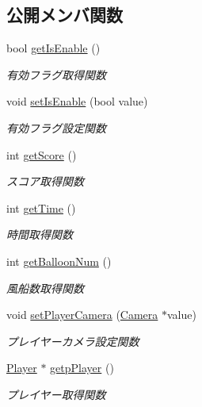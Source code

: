 \subsection*{公開メンバ関数}
\begin{DoxyCompactItemize}
\item 
bool \mbox{\hyperlink{class_stage_manager_ad250f6b9d743f80e67f449abb49e7ac2}{get\+Is\+Enable}} ()
\begin{DoxyCompactList}\small\item\em 有効フラグ取得関数 \end{DoxyCompactList}\item 
void \mbox{\hyperlink{class_stage_manager_a82938cb01ba1adbb3620fee0a12397ec}{set\+Is\+Enable}} (bool value)
\begin{DoxyCompactList}\small\item\em 有効フラグ設定関数 \end{DoxyCompactList}\item 
int \mbox{\hyperlink{class_stage_manager_ae54498baebd27e0b48c7bcfbe6555b34}{get\+Score}} ()
\begin{DoxyCompactList}\small\item\em スコア取得関数 \end{DoxyCompactList}\item 
int \mbox{\hyperlink{class_stage_manager_a861d2cd2829cb25ed06237307f5e98ab}{get\+Time}} ()
\begin{DoxyCompactList}\small\item\em 時間取得関数 \end{DoxyCompactList}\item 
int \mbox{\hyperlink{class_stage_manager_a5f83c5c1f67d47393b4d0be426a21ec0}{get\+Balloon\+Num}} ()
\begin{DoxyCompactList}\small\item\em 風船数取得関数 \end{DoxyCompactList}\item 
void \mbox{\hyperlink{class_stage_manager_a2c7f386ffc5087b8437abd5b881b7156}{set\+Player\+Camera}} (\mbox{\hyperlink{class_camera}{Camera}} $\ast$value)
\begin{DoxyCompactList}\small\item\em プレイヤーカメラ設定関数 \end{DoxyCompactList}\item 
\mbox{\hyperlink{class_player}{Player}} $\ast$ \mbox{\hyperlink{class_stage_manager_af778714de131c8b559c2860647a342a1}{getp\+Player}} ()
\begin{DoxyCompactList}\small\item\em プレイヤー取得関数 \end{DoxyCompactList}\item 

\end{DoxyCompactItemize}
